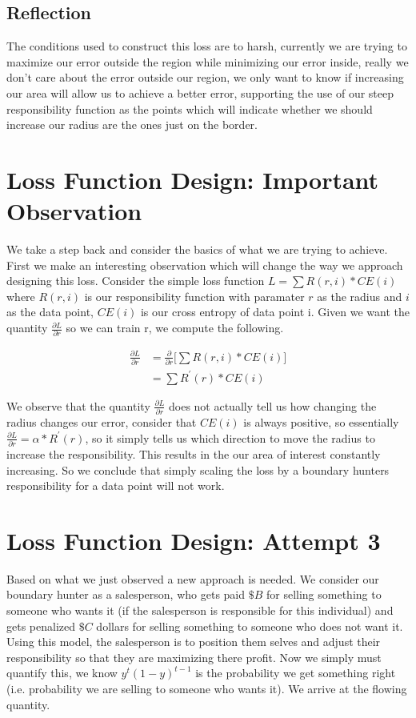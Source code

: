 \documentclass[notitlepage]{report}
\theoremstyle{definition}
\begin{document}
\subsection{Reflection}
The conditions used to construct this loss are to harsh, currently we are trying to maximize our error outside the region while minimizing our error inside, really we don't care about the error outside our region, we only want to know if increasing our area will allow us to achieve a better error, supporting the use of our steep responsibility function as the points which will indicate whether we should increase our radius are the ones just on the border.

\section{Loss Function Design: Important Observation}
We take a step back and consider the basics of what we are trying to achieve. First we make an interesting observation which will change the way we approach designing this loss. Consider the simple loss function $L =\sum R(r, i) * CE(i)$ where $R(r, i)$ is our responsibility function with paramater $r$ as the radius and $i$ as the data point, $CE(i)$ is our cross entropy of data point i. Given we want the quantity $\frac{\partial L}{\partial r}$ so we can train r, we compute the following.

\begin{align*}
\frac{\partial L}{\partial r} &= \frac{\partial}{\partial r} \big[ \sum R(r, i) * CE(i) \big] \\
&= \sum R^{'} (r) * CE(i)
\end{align*} 

We observe that the quantity $\frac{\partial L}{\partial r}$ does not actually tell us how changing the radius changes our error, consider that $CE(i)$ is always positive, so essentially $\frac{\partial L}{\partial r} = \alpha * R^{'}(r)$, so it simply tells us which direction to move the radius to increase the responsibility. This results in the our area of interest constantly increasing. So we conclude that simply scaling the loss by a boundary hunters responsibility for a data point will not work.\\

\section{Loss Function Design: Attempt 3}
Based on what we just observed a new approach is needed. We consider our boundary hunter as a salesperson, who gets paid $\$B$ for selling something to someone who wants it (if the salesperson is responsible for this individual) and gets penalized $\$C$ dollars for selling something to someone who does not want it. Using this model, the salesperson is to position them selves and adjust their responsibility so that they are maximizing there profit. Now we simply must quantify this, we know $y^t(1-y)^{t-1}$ is the probability we get something right (i.e. probability we are selling to someone who wants it). We arrive at the flowing quantity.
\end{document}
